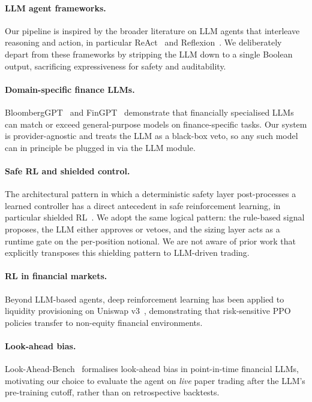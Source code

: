 \documentclass{article}
\begin{document}
\paragraph{LLM agent frameworks.} Our pipeline is inspired by the broader literature on LLM agents that interleave reasoning and action, in particular ReAct~\cite{react_yao2022} and Reflexion~\cite{reflexion_shinn2023}. We deliberately depart from these frameworks by stripping the LLM down to a single Boolean output, sacrificing expressiveness for safety and auditability.
\paragraph{Domain-specific finance LLMs.} BloombergGPT~\cite{bloomberggpt_wu2023} and FinGPT~\cite{fingpt_yang2023} demonstrate that financially specialised LLMs can match or exceed general-purpose models on finance-specific tasks. Our system is provider-agnostic and treats the LLM as a black-box veto, so any such model can in principle be plugged in via the LLM module.
\paragraph{Safe RL and shielded control.} The architectural pattern in which a deterministic safety layer post-processes a learned controller has a direct antecedent in safe reinforcement learning, in particular shielded RL~\cite{shielded_rl_alshiekh2018}. We adopt the same logical pattern: the rule-based signal proposes, the LLM either approves or vetoes, and the sizing layer acts as a runtime gate on the per-position notional. We are not aware of prior work that explicitly transposes this shielding pattern to LLM-driven trading.
\paragraph{RL in financial markets.} Beyond LLM-based agents, deep reinforcement learning has been applied to liquidity provisioning on Uniswap v3~\cite{uniswap_rl}, demonstrating that risk-sensitive PPO policies transfer to non-equity financial environments.
\paragraph{Look-ahead bias.} Look-Ahead-Bench~\cite{lookaheadbench} formalises look-ahead bias in point-in-time financial LLMs, motivating our choice to evaluate the agent on \emph{live} paper trading after the LLM\textquoteright s pre-training cutoff, rather than on retrospective backtests.
\end{document}
